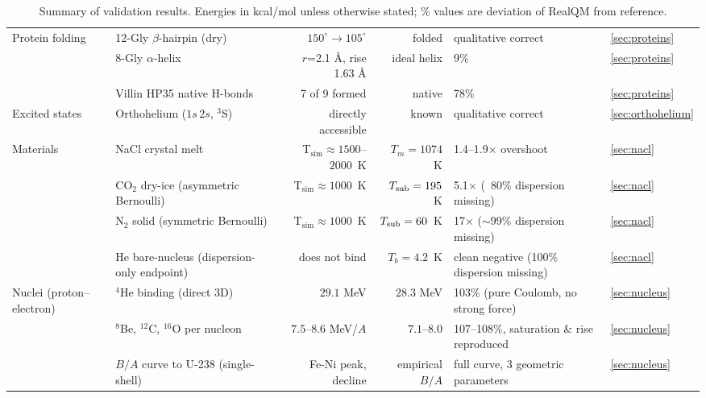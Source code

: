 \documentclass[11pt]{article}
\begin{document}
\begin{table}[h!]
\begin{tabular}{l l r r l l}
\midrule
Protein folding        & 12-Gly $\beta$-hairpin (dry)     & $150^\circ \to 105^\circ$ & folded   & qualitative correct  & \ref{sec:proteins}  \\
                       & 8-Gly $\alpha$-helix             & $r$=2.1 \AA, rise 1.63 \AA & ideal helix & 9\%             & \ref{sec:proteins}  \\
                       & Villin HP35 native H-bonds       & 7 of 9 formed         & native       & 78\%                  & \ref{sec:proteins}  \\
\midrule
Excited states         & Orthohelium ($1s\,2s$, $^3$S)    & directly accessible  & known         & qualitative correct & \ref{sec:orthohelium}\\
\midrule
Materials              & NaCl crystal melt              & T$_\mathrm{sim} \approx 1500$--$2000$~K & $T_m = 1074$~K & 1.4--1.9$\times$ overshoot                & \ref{sec:nacl}     \\
                       & CO$_2$ dry-ice (asymmetric Bernoulli) & T$_\mathrm{sim} \approx 1000$~K  & $T_{\rm sub} = 195$~K  & 5.1$\times$ (~80\% dispersion missing)        & \ref{sec:nacl}     \\
                       & N$_2$ solid (symmetric Bernoulli) & T$_\mathrm{sim} \approx 1000$~K  & $T_{\rm sub} = 60$~K   & 17$\times$ ($\sim$99\% dispersion missing)    & \ref{sec:nacl}     \\
                       & He bare-nucleus (dispersion-only endpoint) & does not bind  & $T_b = 4.2$~K   & clean negative (100\% dispersion missing)    & \ref{sec:nacl}     \\
\midrule
Nuclei (proton--electron) & ${}^4$He binding (direct 3D)  & $29.1$ MeV       & $28.3$ MeV      & 103\% (pure Coulomb, no strong force) & \ref{sec:nucleus} \\
                       & ${}^8$Be, ${}^{12}$C, ${}^{16}$O per nucleon & $7.5$--$8.6$ MeV/$A$ & $7.1$--$8.0$   & 107--108\%, saturation \& rise reproduced & \ref{sec:nucleus} \\
                       & $B/A$ curve to U-238 (single-shell) & Fe-Ni peak, decline & empirical $B/A$ & full curve, 3 geometric parameters & \ref{sec:nucleus} \\
\bottomrule
\end{tabular}
\caption{Summary of validation results. Energies in kcal/mol unless otherwise stated; \% values are deviation of RealQM from reference.}
\label{tab:summary}
\end{table}
\end{document}
